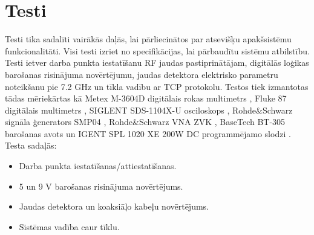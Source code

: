 \chapter{Testi}
Testi tika sadalīti vairākās daļās, lai pārliecinātos par atsevišķu apakšsistēmu funkcionalitāti. Visi testi izriet no specifikācijas, lai pārbaudītu sistēmu atbilstību. Testi ietver darba punkta iestatīšanu RF jaudas pastiprinātājam, digitālās loģikas barošanas risinājuma novērtējumu, jaudas detektora elektrisko parametru noteikšanu pie 7.2 GHz un tīkla vadību ar TCP protokolu. Testos tiek izmantotas tādas mēriekārtas kā Metex M-3604D digitālais rokas multimetrs \cite{metex_multimeter}, Fluke 87 digitālais multimetrs \cite{fluke_multimeter}, SIGLENT SDS-1104X-U osciloskops \cite{oscil}, Rohde\&Schwarz signāla ģenerators SMP04 \cite{rs_signal_generator}, Rohde\&Schwarz VNA ZVK \cite{rs_vna}, BaseTech BT-305 barošanas avots \cite{test_powersupply} un IGENT SPL 1020 XE 200W DC programmējamo slodzi \cite{programmable_load}.
Testa sadaļās:
\begin{itemize}
    \item Darba punkta iestatīšanas/attiestatīšanas.
    \item 5 un 9 V barošanas risinājuma novērtējums.
    \item Jaudas detektora un koaksiāļo kabeļu novērtējums.
    \item Sistēmas vadība caur tīklu.
\end{itemize}




